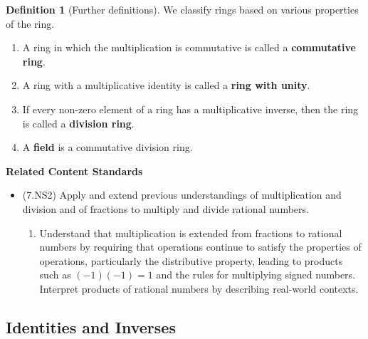\documentclass[
]{book}
\providecommand{\tightlist}{%
  \setlength{\itemsep}{0pt}\setlength{\parskip}{0pt}}
\newenvironment{standards}{}{}
\theoremstyle{definition}
\newtheorem{definition}{Definition}[chapter]
\theoremstyle{definition}
\theoremstyle{definition}
\theoremstyle{definition}
\theoremstyle{remark}
\begin{document}
\begin{definition}[Further definitions]

We classify rings based on various properties of the ring.

\begin{enumerate}
\def\labelenumi{\arabic{enumi}.}
\tightlist
\item
  A ring in which the multiplication is commutative is called a \textbf{commutative ring}.
\item
  A ring with a multiplicative identity is called a \textbf{ring with unity}.
\item
  If every non-zero element of a ring has a multiplicative inverse, then the ring is called a \textbf{division ring}.
\item
  A \textbf{field} is a commutative division ring.
\end{enumerate}

\end{definition}

\begin{standards}

\begin{center}
\textbf{Related Content Standards}

\end{center}

\begin{itemize}
\tightlist
\item
  (7.NS2) Apply and extend previous understandings of multiplication and division and of fractions to multiply and divide rational numbers.

  \begin{enumerate}
  \def\labelenumi{\alph{enumi}.}
  \tightlist
  \item
    Understand that multiplication is extended from fractions to rational numbers by requiring that operations continue to satisfy the properties of operations, particularly the distributive property, leading to products such as \((-1)(-1) = 1\) and the rules for multiplying signed numbers. Interpret products of rational numbers by describing real-world contexts.
  \end{enumerate}
\end{itemize}

\end{standards}

\hypertarget{identities-and-inverses}{%
\subsection{Identities and Inverses}\label{identities-and-inverses}}
\end{document}

